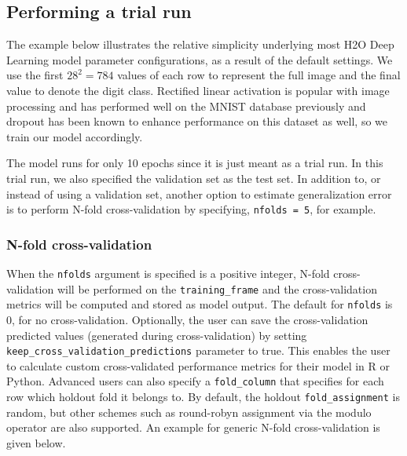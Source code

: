 \waterExampleInPython


\subsection{Performing a trial run}
\label{ssec:TrialRun} 

The example below illustrates the relative simplicity underlying most H2O Deep Learning model parameter configurations, as a result of the default settings. We use the first $28^2 = 784$ values of each row to represent the full image and the final value to denote the digit class. Rectified linear activation is popular with image processing and has performed well on the MNIST database previously and dropout has been known to enhance performance on this dataset as well, so we train our model accordingly. 

\newpage
\waterExampleInR


\waterExampleInPython



\noindent
The model runs for only 10 epochs since it is just meant  as a trial run. In this trial run, we also specified the validation set as the test set.  In addition to, or instead of using a validation set, another option to estimate generalization error is to perform N-fold cross-validation by specifying, \texttt{nfolds = 5}, for example.  

\subsubsection{N-fold cross-validation} 

When the \texttt{nfolds} argument is specified is a positive integer, N-fold cross-validation will be performed on the \texttt{training\_frame} and the cross-validation metrics will be computed and stored as model output.  The default for \texttt{nfolds} is 0, for no cross-validation.  Optionally, the user can save the cross-validation predicted values (generated during cross-validation) by setting \texttt{keep\_cross\_validation\_predictions} parameter to true.  This enables the user to calculate custom cross-validated performance metrics for their model in R or Python.  Advanced users can also specify a \texttt{fold\_column} that specifies for each row which holdout fold it belongs to. By default, the holdout \texttt{fold\_assignment} is random, but other schemes such as round-robyn assignment via the modulo operator are also supported. An example for generic N-fold cross-validation is given below.  

